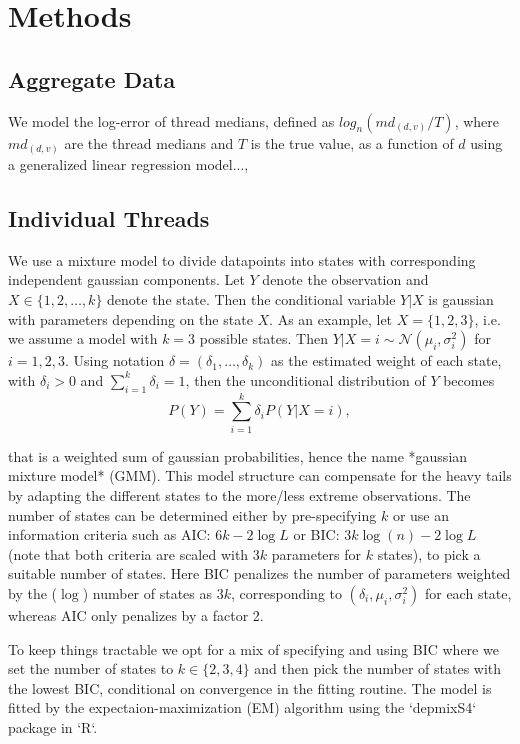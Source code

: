 \documentclass[10pt,a4paper,twocolumn,lineno]{article}
\begin{document}
\section{Methods}

\subsection{Aggregate Data}
\noindent
We model the log-error of thread medians, defined as $log_n(md_{(d,v)}/T)$, where $md_{(d,v)}$ are the thread medians and $T$ is the true value, as a function of $d$ using a generalized linear regression model...,

\subsection{Individual Threads}
\noindent
We use a mixture model to divide datapoints into states with corresponding independent gaussian components. Let $Y$ denote the observation and $X\in\{1,2,\dots,k\}$ denote the state. Then the conditional variable $Y|X$ is gaussian with parameters depending on the state $X$. 
As an example, let $X=\{1,2,3\}$, i.e. we assume a model with $k=3$ possible states. Then $Y|X=i \sim \mathcal{N}(\mu_i,\sigma_i^2)$ for $i=1,2,3$. Using notation $\delta = (\delta_1,\dots,\delta_k)$ as the estimated weight of each state, with $\delta_i >0$ and $\sum_{i=1}^k\delta_i = 1$, then the unconditional distribution of $Y$ becomes
$$
  P(Y) = \sum_{i=1}^k \delta_i P(Y|X=i),
$$

that is a weighted sum of gaussian probabilities, hence the name *gaussian mixture model* (GMM). This model structure can compensate for the heavy tails by adapting the different states to the more/less extreme observations. The number of states can be determined either by pre-specifying $k$ or use an information criteria such as AIC: $6k-2\log L$ or BIC: $3k\log(n)-2\log L$ (note that both criteria are scaled with $3k$ parameters for $k$ states), to pick a suitable number of states. Here BIC penalizes the number of parameters weighted by the ($\log$) number of states as $3k$, corresponding to $(\delta_i,\mu_i,\sigma^2_i)$ for each state, whereas AIC only penalizes by a factor 2. 

To keep things tractable we opt for a mix of specifying and using BIC where we set the number of states to $k\in\{2,3,4\}$ and then pick the number of states with the lowest BIC, conditional on convergence in the fitting routine. The model is fitted by the expectaion-maximization (EM) algorithm using the `depmixS4` package in `R`.
\end{document}
